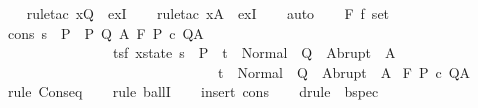 \begin{isabellebody}
\ \ \isamarkupfalse%
\ {\isacharparenleft}rule{\isacharunderscore}tac\ x{\isacharequal}Q{\isacharprime}\ \ exI{\isacharparenright}\isanewline
\ \ \isamarkupfalse%
\ {\isacharparenleft}rule{\isacharunderscore}tac\ x{\isacharequal}A{\isacharprime}\ \ exI{\isacharparenright}\isanewline
\ \ \isamarkupfalse%
\ auto\isanewline
\ \ \isamarkupfalse%
%
\endisatagproof
{\isafoldproof}%
%
\isadelimproof
\isanewline
%
\endisadelimproof
\isanewline
{}\isamarkupfalse%
\isanewline
{}\ F{\isacharcolon}{\isacharcolon}\ {\isachardoublequoteopen}{\isacharprime}f\ set{\isachardoublequoteclose}\isanewline
{}\ cons{\isacharcolon}\ {\isachardoublequoteopen}{\isasymforall}s\ {\isasymin}\ P{\isachardot}\ \ {\isasymexists}P{\isacharprime}\ Q{\isacharprime}\ A{\isacharprime}{\isachardot}\ {\isasymGamma}{\isacharcomma}{\isasymTheta}{\isasymturnstile}\isactrlbsub {\isacharslash}F\isactrlesub \ P{\isacharprime}\ c\ Q{\isacharprime}{\isacharcomma}A{\isacharprime}\ {\isasymand}\isanewline
\ \ \ \ \ \ \ \ \ \ \ \ \ \ \ \ {\isacharparenleft}{\isasymforall}{\isacharparenleft}t{\isacharcolon}{\isacharcolon}{\isacharparenleft}{\isacharprime}s{\isacharcomma}{\isacharprime}f{\isacharparenright}\ xstate{\isacharparenright}{\isachardot}\ {\isacharparenleft}s\ {\isasymin}\ P{\isacharprime}\ {\isasymlongrightarrow}\ t\ {\isasymin}\ Normal\ {\isacharbackquote}\ Q{\isacharprime}\ {\isasymunion}\ Abrupt\ {\isacharbackquote}\ A{\isacharprime}{\isacharparenright}\isanewline
\ \ \ \ \ \ \ \ \ \ \ \ \ \ \ \ \ \ \ \ \ \ \ \ \ \ \ \ \ \ {\isasymlongrightarrow}\ t\ {\isasymin}\ Normal\ {\isacharbackquote}\ Q\ {\isasymunion}\ Abrupt\ {\isacharbackquote}\ A{\isacharparenright}{\isachardoublequoteclose}\isanewline
{}\ {\isachardoublequoteopen}{\isasymGamma}{\isacharcomma}{\isasymTheta}{\isasymturnstile}\isactrlbsub {\isacharslash}F\isactrlesub \ P\ c\ Q{\isacharcomma}A\ {\isachardoublequoteclose}\isanewline
%
\isadelimproof
\ \ %
\endisadelimproof
%
\isatagproof
{}\isamarkupfalse%
\ {\isacharparenleft}rule\ Conseq{\isacharparenright}\isanewline
\ \ \isamarkupfalse%
\ {\isacharparenleft}rule\ ballI{\isacharparenright}\isanewline
\ \ \isamarkupfalse%
\ {\isacharparenleft}insert\ cons{\isacharparenright}\isanewline
\ \ \isamarkupfalse%
\ {\isacharparenleft}drule\ {\isacharparenleft}{}{\isacharparenright}\ bspec{\isacharparenright}\isanewline
\ \ \isamarkupfalse%

\end{isabellebody}

